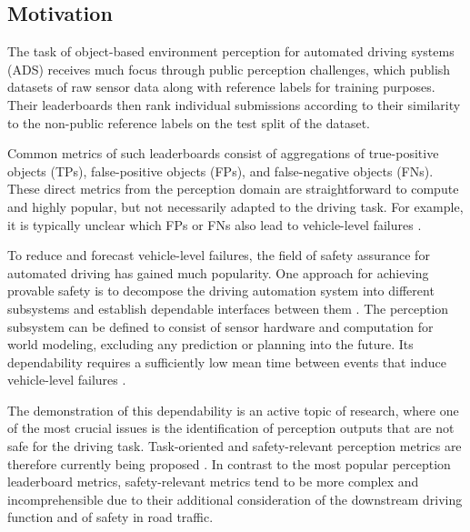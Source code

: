 \documentclass[conference]{IEEEtran}
\begin{document}
\subsection{Motivation}

The task of object-based environment perception for automated driving systems (ADS) receives much focus through public perception challenges, %
which publish datasets of raw sensor data along with reference labels for training purposes. 
Their leaderboards then rank individual submissions according to their similarity to the non-public reference labels on the test split of the dataset.

Common metrics of such leaderboards consist of aggregations of true-positive objects (TPs), false-positive objects (FPs), and false-negative objects (FNs). 
These direct metrics from the perception domain are straightforward to compute and highly popular, but not necessarily adapted to the driving task. 
For example, it is typically unclear which FPs or FNs also lead to vehicle-level failures \cite{Oboril2022mtbf_ieee}. 

To reduce and forecast vehicle-level failures, the field of safety assurance for automated driving has gained much popularity. 
One approach for achieving provable safety is to decompose the driving automation system into different subsystems and establish dependable interfaces between them \cite{amersbach2017functional}. 
The perception subsystem can be defined to consist of sensor hardware and computation for world modeling, excluding any prediction or planning into the future. 
Its dependability requires a sufficiently low mean time between events that induce vehicle-level failures \cite{Oboril2022mtbf_ieee}. 


The demonstration of this dependability is an active topic of research, where one of the most crucial issues is the identification of perception outputs that are not safe for the driving task. 
Task-oriented and safety-relevant perception metrics are therefore currently being proposed  \cite{Madala2023metrics,  Lyssenko2022safety, Hoss2023rollingreview}. 
In contrast to the most popular perception leaderboard metrics, safety-relevant metrics tend to be more complex and incomprehensible due to their additional consideration of the downstream driving function and of safety in road traffic. 
\end{document}
